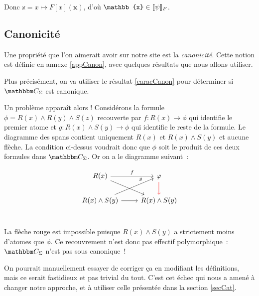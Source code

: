 \begin{pv}
    Donc $\mathbb{x} = x\mapsto F[x](\mathbf{x})$, d'où $\mathbb{x}\in\sem{\psi}_F$.
\end{pv}

\subsection{Canonicité}

Une propriété que l'on aimerait avoir sur notre site est la \emph{canonicité}. Cette
notion est définie en annexe \ref{appCanon}, avec quelques résultats que nous allons
utiliser.

Plus précisément, on va utiliser le résultat \ref{caracCanon} pour déterminer si
$\C_\Sigma$ est canonique.

Un problème apparaît alors ! Considérons la formule $\phi=R(x)\wedge R(y)\wedge S(z)$
recouverte par $f:R(x)\rightarrow\phi$ qui identifie le premier atome et
$g:R(x)\wedge S(y)\rightarrow\phi$ qui identifie le reste de la formule. Le diagramme
des spans contient uniquement $R(x)$ et $R(x)\wedge S(y)$ et aucune flèche. La
condition ci-dessus voudrait donc que $\phi$ soit le produit de ces deux formules dans
$\C_\Sigma$. Or on a le diagramme suivant~:

\[\begin{tikzcd}
    R(x) \arrow[r, "f"] \arrow[rd] & \phi \arrow[d, red] \\
    R(x)\wedge S(y) \arrow[ru, near end, "g"] \arrow[r] & R(x)\wedge S(y) \\
\end{tikzcd}\]

La flèche rouge est impossible puisque $R(x)\wedge S(y)$ a strictement moins d'atomes
que $\phi$. Ce recouvrement n'est donc pas effectif polymorphique~: $\C_\Sigma$ n'est pas
sous canonique~!

On pourrait manuellement essayer de corriger ça en modifiant les définitions, mais ce
serait fastidieux et pas trivial du tout. C'est cet échec qui nous a amené à changer
notre approche, et à utiliser celle présentée dans la section \ref{secCat}.

